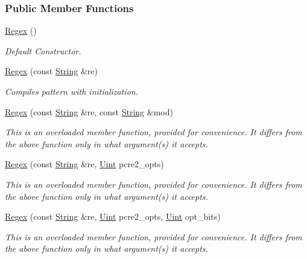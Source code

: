 \subsubsection*{Public Member Functions}
\begin{DoxyCompactItemize}
\item 
\hyperlink{classjpcre2_1_1Regex_a302f65cd5747c5d34570ca76516ab715}{Regex} ()
\begin{DoxyCompactList}\small\item\em Default Constructor. \end{DoxyCompactList}\item 
\hyperlink{classjpcre2_1_1Regex_a4d959fdc32791bee6d819abfc44af51a}{Regex} (const \hyperlink{namespacejpcre2_a91f03070152fb228bc116c5a737f1d16}{String} \&re)
\begin{DoxyCompactList}\small\item\em Compiles pattern with initialization. \end{DoxyCompactList}\item 
\hyperlink{classjpcre2_1_1Regex_a58be9b4e1eaec2a43586af45c6ae5549}{Regex} (const \hyperlink{namespacejpcre2_a91f03070152fb228bc116c5a737f1d16}{String} \&re, const \hyperlink{namespacejpcre2_a91f03070152fb228bc116c5a737f1d16}{String} \&mod)
\begin{DoxyCompactList}\small\item\em This is an overloaded member function, provided for convenience. It differs from the above function only in what argument(s) it accepts. \end{DoxyCompactList}\item 
\hyperlink{classjpcre2_1_1Regex_a8f8a1eabf09292b782a6f33287e3fee4}{Regex} (const \hyperlink{namespacejpcre2_a91f03070152fb228bc116c5a737f1d16}{String} \&re, \hyperlink{namespacejpcre2_a078242d38221a13fb3543b9edd78c099}{Uint} pcre2\+\_\+opts)
\begin{DoxyCompactList}\small\item\em This is an overloaded member function, provided for convenience. It differs from the above function only in what argument(s) it accepts. \end{DoxyCompactList}\item 
\hyperlink{classjpcre2_1_1Regex_abe210e2ca6cfcef11760875930cf069d}{Regex} (const \hyperlink{namespacejpcre2_a91f03070152fb228bc116c5a737f1d16}{String} \&re, \hyperlink{namespacejpcre2_a078242d38221a13fb3543b9edd78c099}{Uint} pcre2\+\_\+opts, \hyperlink{namespacejpcre2_a078242d38221a13fb3543b9edd78c099}{Uint} opt\+\_\+bits)
\begin{DoxyCompactList}\small\item\em This is an overloaded member function, provided for convenience. It differs from the above function only in what argument(s) it accepts. \end{DoxyCompactList}\item 

\end{DoxyCompactItemize}
